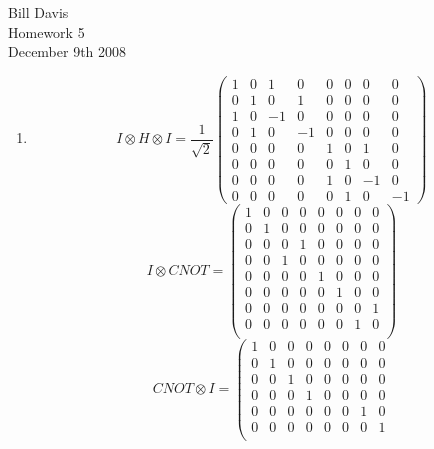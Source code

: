\documentclass[11pt,fleqn]{article}
\begin{document}
\newcommand{\mbf}[1]{\mbox{{\bfseries #1}}}
\newcommand{\N}{\mbf{N}}
\renewcommand{\O}{\mbf{O}}

\newcommand{\braket}[2]{\left \langle #1 \right. \left | #2 \right \rangle}

\noindent Bill Davis \\
Homework 5 \\
December 9th 2008


\begin{enumerate}
\item %
\[
I \otimes H \otimes I = \frac{1}{\sqrt{2}}
 \left( \begin{array}{cccccccc}
						1 & 0 & 1  & 0 & 0 & 0 & 0 & 0    \\
						0 & 1 & 0  & 1 & 0 & 0 & 0 & 0    \\
						1 & 0 & -1 & 0 & 0 & 0 & 0 & 0    \\
                  0 & 1 & 0 & -1 & 0 & 0 & 0 & 0    \\
						0 & 0 & 0 & 0  & 1 & 0 & 1 & 0    \\
						0 & 0 & 0 & 0  & 0 & 1 & 0 & 0    \\
						0 & 0 & 0 & 0  & 1 & 0 & -1 & 0   \\
                  0 & 0 & 0 & 0  & 0 & 1 & 0 & -1    
						  \end{array} \right)
\]
\[
I \otimes CNOT = 
 \left( \begin{array}{cccccccc}
1 & 0 & 0 & 0 & 0 & 0 & 0 & 0 \\
0 & 1 & 0 & 0 & 0 & 0 & 0 & 0 \\
0 & 0 & 0 & 1 & 0 & 0 & 0 & 0 \\
0 & 0 & 1 & 0 & 0 & 0 & 0 & 0 \\
0 & 0 & 0 & 0 & 1 & 0 & 0 & 0 \\
0 & 0 & 0 & 0 & 0 & 1 & 0 & 0 \\
0 & 0 & 0 & 0 & 0 & 0 & 0 & 1 \\
0 & 0 & 0 & 0 & 0 & 0 & 1 & 0 \\
\end{array} \right)
\]
\[
CNOT \otimes I = 
 \left( \begin{array}{cccccccc}
1 & 0 & 0 & 0 & 0 & 0 & 0 & 0 \\
0 & 1 & 0 & 0 & 0 & 0 & 0 & 0\\
0 & 0 & 1 & 0 & 0 & 0 & 0 & 0 \\
0 & 0 & 0 & 1 & 0 & 0 & 0 & 0 \\
0 & 0 & 0 & 0 & 0 & 0 & 1 & 0 \\
0 & 0 & 0 & 0 & 0 & 0 & 0 & 1 \\

\end{array}\]
\end{enumerate}
\end{document}
